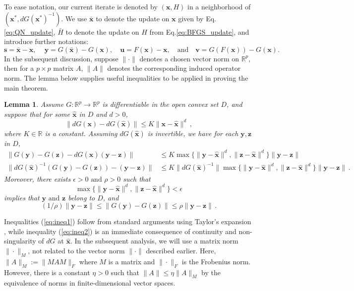 \documentclass{statsoc}
\newtheorem{lemma}{Lemma}
\newcommand{\bs}{\boldsymbol{s}}
\newcommand{\bu}{\boldsymbol{u}}
\newcommand{\bv}{\boldsymbol{v}}
\newcommand{\bx}{\boldsymbol{x}}
\newcommand{\by}{\boldsymbol{y}}
\newcommand{\bz}{\boldsymbol{z}}
\begin{document}
To ease notation, our current iterate is denoted by $(\bx,H)$ in a neighborhood of $(\bx^\ast, dG(\bx^\ast)^{-1})$. We use $\bar{\bx}$ to denote the update on $\bx$ given by Eq.\eqref{eq:QN_update}, $\bar{H}$ to denote the update on $H$ from Eq.\eqref{eq:BFGS_update}, and introduce further notations: %
$$\bs = \bar{\bx} - \bx,\, \quad \by = G(\bar{\bx}) - G(\bx), \quad  \bu = F(\bx) - \bx, \quad \text{and} \quad \bv = G(F(\bx)) - G(\bx). $$
In the subsequent discussion, suppose $\|\cdot\|$ denotes a chosen vector norm on $\mathbb{R}^p$, then for a $p \times p$ matrix $A$, $\|A\|$ denotes the corresponding induced operator norm. The lemma below supplies useful inequalities to be applied in proving the main theorem. 

\begin{lemma} \label{lemma:lipchitz}
Assume $G: \mathbb{R}^p \to \mathbb{R}^p$ is differentiable in the open convex set $D$, and suppose that for some $\widehat{\bx}$ in $D$ and $d > 0$,
\begin{equation} \label{eq:lipchitz}
    \|dG(\bx) - dG(\widehat{\bx})\| \leq K \|\bx-\widehat{\bx}\|^d\,,
\end{equation}
where $K \in \mathbb{R}$ is a constant. Assuming $dG(\widehat{\bx})$ is invertible, we have for each $\by, \bz $ in $D$,
\begin{align}
    \|G(\by) - G(\bz) - dG(\widehat{\bx})(\by-\bz)\| & \leq K \max\{\|\by - \widehat{\bx}\|^d, \|\bz - \widehat{\bx}\|^d\}\|\by-\bz\| \label{eq:ineq1}  \nonumber \\
    \|dG(\widehat{\bx})^{-1}(G(\by) - G(\bz)) - (\by - \bz)\| &\leq K \|dG(\widehat{\bx})^{-1}\| \max\{\|\by - \widehat{\bx}\|^d, \|\bz - \widehat{\bx}\|^d\} \|\by-\bz\|\,.
\end{align}
 Moreover, there exists $\epsilon >0 \text{ and } \rho >0$ such that 
 \[ \max\{\|\by - \widehat{\bx}\|^d, \|\bz - \widehat{\bx}\|^d\} < \epsilon\] 
 implies that $\by \text{ and } \bz$ belong to $D$, and
\begin{equation} \label{eq:ineq2}
    (1/\rho)\|\by-\bz\| \leq \|G(\by) - G(\bz)\| \leq \rho\|\by-\bz\|\,.
\end{equation}
\end{lemma}
Inequalities (\ref{eq:ineq1}) follow from standard arguments using Taylor's expansion \citep{ortega2000iterative}, while inequality (\ref{eq:ineq2}) is an immediate consequence of continuity and non-singularity of $dG$ at $\widehat{\bx}$. In the subsequent analysis, we will use a matrix norm $\|\cdot\|_M$, not related to the vector norm $\|\cdot\|$ described earlier. Here, $\|A\|_M := \|MAM\|_F$ where $M$ is a matrix and $\|\cdot\|_F$ is the Frobenius norm. However, there is a constant $\eta > 0$ such that $\|A\| \leq \eta \|A\|_M$ by the equivalence of norms in finite-dimensional vector spaces. 
\end{document}
